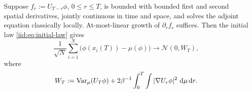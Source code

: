 \documentclass[11pt,reqno]{amsart}
\numberwithin{equation}{section}
\theoremstyle{plain}
\theoremstyle{remark}
\begin{document}
\begin{prop}\label{iid:prop:clt}
Suppose $f_r:=U_{T-r}\phi$, $0\le r\le T$, is bounded with bounded first and second spatial derivatives, jointly continuous in time and space, and solves the adjoint equation classically locally. At-most-linear growth of $\partial_rf_r$ suffices. Then the initial law \eqref{iid:eq:initial-law} gives
\begin{equation}\label{iid:eq:clt}
 \frac1{\sqrt N}\sum_{i=1}^N\bigl(\phi(x_i(T))-\mu(\phi)\bigr)
 \longrightarrow\mathcal N(0,W_T),
\end{equation}
where
\begin{equation}\label{iid:eq:covariance}
 W_T:=\operatorname{Var}_\mu(U_T\phi)+2\beta^{-1}\int_0^T\int|\nabla U_r\phi|^2\,\,\mathrm d\mu\,\mathrm d r.
\end{equation}
\end{prop}
\end{document}

